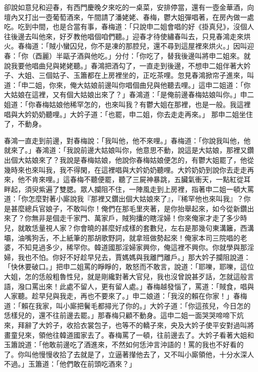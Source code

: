 卻說如意兒和迎春，有西門慶晚夕來吃的一桌菜，安排停當，還有一壺金華酒，向壇內又打出一壺葡萄酒來，午間請了潘姥姥、春梅，鬱大姐彈唱著，在房內做一處吃。吃到中間，也是合當有事，春梅道：「只說申二姐會唱的好《掛真兒》，沒個人往後邊去叫他來，好歹教他唱個咱們聽。」迎春才待使繡春叫去，只見春鴻走來烘火。春梅道：「賊小蠻囚兒，你不是凍的那腔兒，還不尋到這屋裡來烘火。」因叫迎春：「你（酉麗）半甌子酒與他吃。」分付：「你吃了，替我後邊叫將申二姐來。就說我要他唱曲兒與姥姥聽。」春鴻把酒勾了，一直走到後邊，不想申二姐伴著大妗子、大姐、三個姑子、玉簫都在上房裡坐的，正吃茶哩。忽見春鴻掀帘子進來，叫道：「申二姐，你來，俺大姑娘前邊叫你唱個曲兒與他聽去哩。」這申二姐道：「你大姑娘在這裡，又有個大姑娘出來了？」春鴻道：「是俺前邊春梅姑娘叫你。」申二姐道：「你春梅姑娘他稀罕怎的，也來叫我？有鬱大姐在那裡，也是一般。我這裡唱與大妗奶奶聽哩。」大妗子道：「也罷，申二姐，你去走走再來。」 那申二姐坐住了，不動身。

春鴻一直走到前邊，對春梅說：「我叫他，他不來哩。」春梅道：「你說我叫他，他就來了。」春鴻道：「我說前邊大姑娘叫你，他意思不動，說這是大姑娘，那裡又鑽出個大姑娘來了？我說是春梅姑娘，他說你春梅姑娘便怎的，有鬱大姐罷了，他從幾時來也來叫我，我不得閑，在這裡唱與大妗奶奶聽哩。大妗奶奶到說你去走走再來，他不肯來哩。」這春梅不聽便罷，聽了三屍神暴跳，五臟氣衝天，一點紅從耳畔起，須臾紫遍了雙腮。眾人攔阻不住，一陣風走到上房裡，指著申二姐一頓大罵道：「你怎麼對著小廝說我『那裡又鑽出個大姑娘來了』，『稀罕他也來叫我』？你是甚麼總兵官娘子，不敢叫你！俺們在那毛里夾著，是你抬舉起來，如今從新鑽出來了？你無非是個走千家門、萬家戶，賊狗攮的瞎淫婦！你來俺家才走了多少時兒，就敢恁量視人家？你會曉的甚麼好成樣的套數兒，左右是那幾句東溝籬，西溝壩，油嘴狗舌，不上紙筆的那胡歌野詞，就拿班做勢起來！俺家本司三院唱的老婆，不知見過多少，稀罕你。韓道國那淫婦家興你，俺這裡不興你。你就學與那淫婦，我也不怕。你好不好趁早兒去，賈媽媽與我離門離戶。」那大妗子攔阻說道：「快休要破口。」把申二姐罵的睜睜的，敢怒而不敢言，說道：「耶嚛，耶嚛，這位大姐，怎的恁般粗魯性兒，就是剛纔對著大官兒，我也沒曾說甚歹話，怎就這般言語，潑口罵出來！此處不留人，更有留人處。」春梅越發惱了，罵道：「賊食，唱與人家聽。趁早兒與我走，再也不要來了。」申二娘道：「我沒的賴在你家！」春梅道：「賴在我家，叫小廝把鬢毛都撏光了你的。」大妗子道：「你這孩兒，今日怎的恁樣兒的，還不往前邊去罷。」那春梅只顧不動身。這申二姐一面哭哭啼啼下炕來，拜辭了大妗子，收拾衣裳包子，也等不的轎子來，央及大妗子使平安對過叫將畫童兒來，領他往韓道國家去了。春梅罵了一頓，往前邊去了。大妗子看著大姐和玉簫說道：「他敢前邊吃了酒進來，不然如何恁沖言沖語的！罵的我也不好看的了。你叫他慢慢收拾了去就是了，立逼著攆他去了，又不叫小廝領他，十分水深人不過。」玉簫道：「他們敢在前頭吃酒來？」

